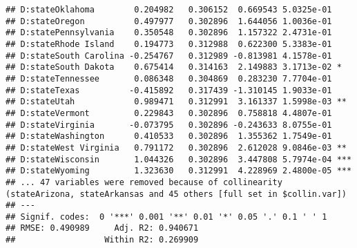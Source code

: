 \documentclass[
]{article}
\begin{document}
\begin{verbatim}
## D:stateOklahoma        0.204982   0.306152  0.669543 5.0325e-01    
## D:stateOregon          0.497977   0.302896  1.644056 1.0036e-01    
## D:statePennsylvania    0.350548   0.302896  1.157322 2.4731e-01    
## D:stateRhode Island    0.194773   0.312988  0.622300 5.3383e-01    
## D:stateSouth Carolina -0.254767   0.312989 -0.813981 4.1578e-01    
## D:stateSouth Dakota    0.675414   0.314163  2.149883 3.1713e-02 *  
## D:stateTennessee       0.086348   0.304869  0.283230 7.7704e-01    
## D:stateTexas          -0.415892   0.317439 -1.310145 1.9033e-01    
## D:stateUtah            0.989471   0.312991  3.161337 1.5998e-03 ** 
## D:stateVermont         0.229843   0.302896  0.758818 4.4807e-01    
## D:stateVirginia       -0.073795   0.302896 -0.243633 8.0755e-01    
## D:stateWashington      0.410533   0.302896  1.355362 1.7549e-01    
## D:stateWest Virginia   0.791172   0.302896  2.612028 9.0846e-03 ** 
## D:stateWisconsin       1.044326   0.302896  3.447808 5.7974e-04 ***
## D:stateWyoming         1.323630   0.312991  4.228969 2.4800e-05 ***
## ... 47 variables were removed because of collinearity (stateArizona, stateArkansas and 45 others [full set in $collin.var])
## ---
## Signif. codes:  0 '***' 0.001 '**' 0.01 '*' 0.05 '.' 0.1 ' ' 1
## RMSE: 0.490989     Adj. R2: 0.940671
##                  Within R2: 0.269909
\end{verbatim}
\end{document}
